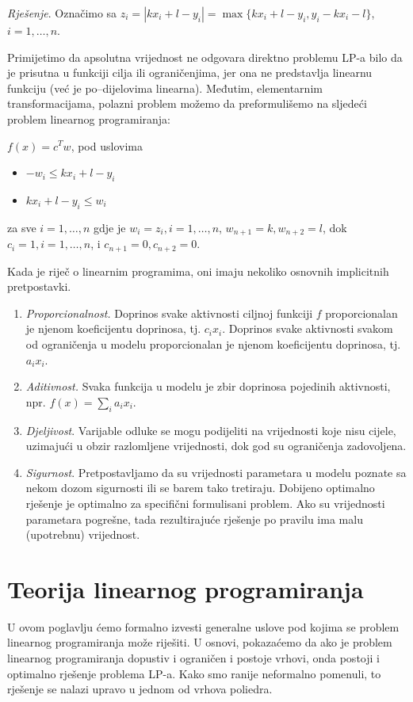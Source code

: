 \documentclass[a4paper, utf8, 11pt, colorlinks]{book}
\begin{document}
\emph{Rješenje}.
Označimo sa $z_i = |k x_i + l - y_i| = \max\{k x_i + l - y_i, y_i - k x_i - l \}$, $i=1,\ldots,n$. 

Primijetimo da apsolutna vrijednost ne odgovara direktno problemu LP-a bilo da je prisutna u funkciji cilja ili ograničenjima, jer ona ne predstavlja linearnu funkciju (već je po--dijelovima linearna). Međutim, elementarnim transformacijama, polazni problem možemo da preformulišemo na sljedeći  problem linearnog programiranja: %

$f(x) = c^T w$, pod uslovima
\begin{itemize}
    \item $ -w_i \leq k x_i + l - y_i$ 
    \item $ k x_i + l - y_i \leq w_i $
\end{itemize}
za sve $i = 1, \ldots, n$ gdje je 
$w_i = z_i, i=1,\ldots,n$, $w_{n+1} = k, w_{n+2} = l$, dok 
$c_i = 1, i=1,\ldots,n$, i $c_{n+1} = 0, c_{n+2} = 0$. 



 
Kada je riječ o linearnim programima,  oni imaju nekoliko osnovnih implicitnih pretpostavki. 
\begin{enumerate}
    \item \emph{Proporcionalnost.} Doprinos svake aktivnosti ciljnoj funkciji $f$ proporcionalan je njenom koeficijentu doprinosa, tj. $c_ix_i$. Doprinos svake aktivnosti svakom od  ograničenja u modelu proporcionalan je njenom  koeficijentu doprinosa, tj. $a_ix_i$.
    \item  \emph{Aditivnost.} Svaka funkcija u modelu je zbir  doprinosa pojedinih aktivnosti, npr. $f(x) = \sum_i a_i x_i$.
    \item \emph{Djeljivost}. Varijable odluke se mogu podijeliti na vrijednosti koje nisu cijele, uzimajući u obzir  razlomljene vrijednosti, dok god su ograničenja zadovoljena.  
    \item \emph{Sigurnost}. Pretpostavljamo da su vrijednosti parametara u modelu poznate
    sa nekom dozom sigurnosti ili se barem tako tretiraju. Dobijeno optimalno rješenje je optimalno za specifični formulisani problem. Ako su vrijednosti parametara pogrešne, tada rezultirajuće rješenje po pravilu ima malu (upotrebnu)  vrijednost.  
\end{enumerate}

\section{Teorija linearnog programiranja}
U ovom poglavlju ćemo formalno izvesti generalne uslove pod kojima se problem linearnog programiranja može riješiti. U osnovi, pokazaćemo da ako je problem
linearnog programiranja dopustiv i ograničen i postoje vrhovi, onda postoji i optimalno rješenje  problema LP-a. Kako smo ranije neformalno pomenuli,  to rješenje se nalazi upravo u jednom od vrhova poliedra. 
\end{document}
